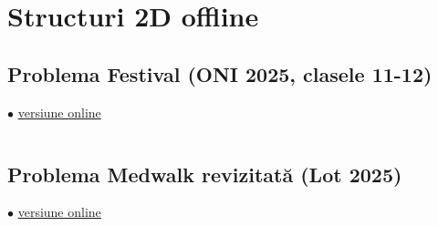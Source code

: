 \documentclass[../main.tex]{subfiles}
\begin{document}
\chapter{Structuri 2D offline}

\section{Problema Festival (ONI 2025, clasele 11-12)}
\label{code:festival}
$\bullet$
\href{https://kilonova.ro/submissions/1161212}{versiune online}

\inputminted{cpp}{../src/offline-2d/festival.cpp}

\section{Problema Medwalk revizitată (Lot  2025)}
\label{code:medwalk-fenwick}
$\bullet$
\href{https://kilonova.ro/submissions/770475}{versiune online}

\inputminted{cpp}{../src/offline-2d/medwalk.cpp}
\end{document}
